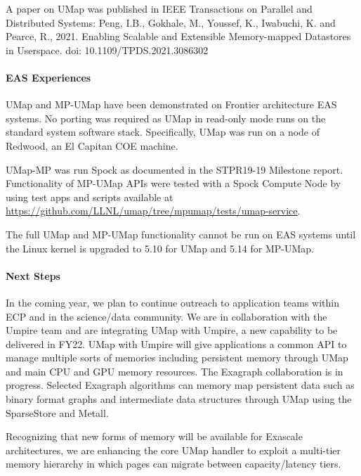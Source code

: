 A paper on UMap was published in IEEE Transactions on Parallel and
Distributed Systems:  Peng, I.B., Gokhale, M., Youssef, K., Iwabuchi,
K. and Pearce, R., 2021. Enabling Scalable and Extensible
Memory-mapped Datastores in Userspace. doi: 10.1109/TPDS.2021.3086302

\paragraph{EAS Experiences}

UMap and MP-UMap have been demonstrated on Frontier architecture EAS
systems. No porting was required as UMap in read-only mode runs on the
standard system software stack. Specifically, UMap was run on a node
of Redwood, an El Capitan COE machine.

  UMap-MP was run Spock as documented in the STPR19-19 Milestone
  report. Functionality of MP-UMap APIs were tested with a Spock Compute
  Node by using test apps and scripts available at \\
\url{https://github.com/LLNL/umap/tree/mpumap/tests/umap-service}.

The full UMap and MP-UMap functionality cannot be run on EAS systems
until the Linux kernel is upgraded to 5.10 for UMap and 5.14 for MP-UMap.

\paragraph{Next Steps}
In the coming year, we plan to continue outreach to application teams
within ECP and in the science/data community. We are in collaboration
with the Umpire team and are integrating UMap with Umpire, a new
capability to be delivered in FY22. UMap with Umpire will give
applications a common API to manage multiple sorts of memories
including persistent memory through UMap and main CPU and GPU memory
resources. The Exagraph collaboration is in progress. Selected
Exagraph algorithms can memory map persistent data such as
binary format graphs and intermediate data structures through UMap
using the SparseStore and Metall.

Recognizing that new forms of memory will be available for Exascale
architectures, we are enhancing the core UMap handler to exploit a
multi-tier memory hierarchy in which pages can migrate between
capacity/latency tiers.

